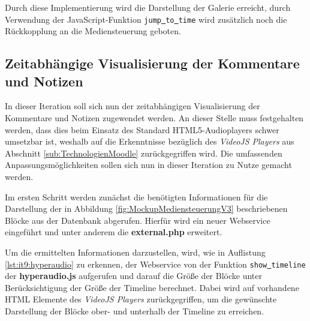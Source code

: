 Durch diese Implementierung wird die Darstellung der Galerie erreicht, durch Verwendung der JavaScript-Funktion \texttt{jump\underline{{ }}to\underline{{ }}time} wird zusätzlich noch die Rückkopplung an die Mediensteuerung geboten.


\subsection{Zeitabhängige Visualisierung der Kommentare und Notizen}
In dieser Iteration soll sich nun der zeitabhängigen Visualisierung der Kommentare und Notizen zugewendet werden. An dieser Stelle muss festgehalten werden, dass dies beim Einsatz des Standard HTML5-Audioplayers schwer umsetzbar ist, weshalb auf die Erkenntnisse bezüglich des \textit{VideoJS Players} aus Abschnitt \ref{sub:TechnologienMoodle} zurückgegriffen wird. Die umfassenden Anpassungsmöglichkeiten sollen sich nun in dieser Iteration zu Nutze gemacht werden.

Im ersten Schritt werden zunächst die benötigten Informationen für die Darstellung der in Abbildung \ref{fig:MockupMediensteuerungV3} beschriebenen Blöcke aus der Datenbank abgerufen. Hierfür wird ein neuer Webservice eingeführt und unter anderem  die \textbf{external.php} erweitert.

Um die ermittelten Informationen darzustellen, wird, wie in Auflistung \ref{lst:it9:hyperaudio} zu erkennen, der Webservice von der Funktion \texttt{show\underline{{ }}timeline} der \textbf{hyperaudio.js} aufgerufen und darauf die Größe der Blöcke unter Berücksichtigung der Größe der Timeline berechnet. Dabei wird auf vorhandene HTML Elemente des \textit{VideoJS Players} zurückgegriffen, um die gewünschte Darstellung der Blöcke ober- und unterhalb der Timeline zu erreichen.

